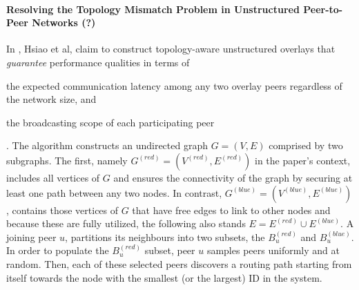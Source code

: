\documentclass[acmcsur,acmnow]{acmtrans2m}
\begin{document}
%
%

\paragraph*{\textbf{Resolving the Topology Mismatch Problem in Unstructured Peer-to-Peer Networks (?)}}

In \cite{hsiao_redblue_2009}, Hsiao et al, claim to construct topology-aware unstructured overlays that \emph{guarantee} performance qualities in terms of
\begin{inparaenum}
  \item the expected communication latency among any two overlay peers regardless of the network size, and
  \item the broadcasting scope of each participating peer
\end{inparaenum}
. The algorithm constructs an undirected graph $G = \left( V, E \right)$ comprised by two subgraphs. The first, namely $G^{\left( red \right)} = \left( V^{\left( red \right)}, E^{\left( red \right)} \right)$ in the paper's context, includes all vertices of $G$ and ensures the connectivity of the graph by securing at least one path between any two nodes. In contrast, $G^{\left( blue \right)} = \left( V^{\left( blue \right)}, E^{\left( blue \right)} \right)$, contains those vertices of $G$ that have free edges to link to other nodes and because these are fully utilized, the following also stands $E = E^{\left( red \right)} \cup E^{\left( blue \right)}$. A joining peer $u$, partitions its neighbours into two subsets, the $B_u^{\left( red \right)}$ and $B_u^{\left( blue \right)}$. In order to populate the $B_u^{\left( red \right)}$ subset, peer $u$ samples peers uniformly and at random. Then, each of these selected peers discovers a routing path starting from itself towards the node with the smallest (or the largest) ID in the system.
\end{document}
